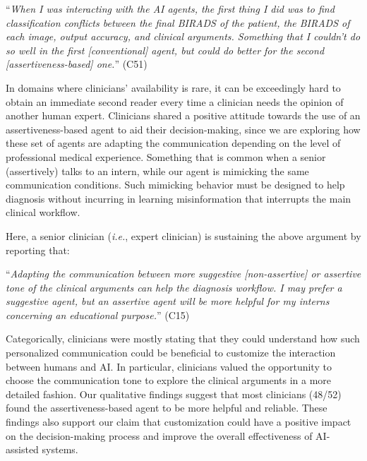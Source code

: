 \vspace{2.5mm}

\noindent
``{\it When I was interacting with the AI agents, the first thing I did was to find classification conflicts between the final BIRADS of the patient, the BIRADS of each image, output accuracy, and clinical arguments. Something that I couldn't do so well in the first [conventional] agent, but could do better for the second [assertiveness-based] one.}'' (C51)

\vspace{2.5mm}

In domains where clinicians' availability is rare, it can be exceedingly hard to obtain an immediate second reader every time a clinician needs the opinion of another human expert.
Clinicians shared a positive attitude towards the use of an assertiveness-based agent to aid their decision-making, since we are exploring how these set of agents are adapting the communication depending on the level of professional medical experience.
Something that is common when a senior (assertively) talks to an intern, while our agent is mimicking the same communication conditions.
Such mimicking behavior must be designed to help diagnosis without incurring in learning misinformation that interrupts the main clinical workflow.

\noindent
Here, a senior clinician ({\it i.e.}, expert clinician) is sustaining the above argument by reporting that:

\vspace{2.5mm}

\noindent
``{\it Adapting the communication between more suggestive [non-assertive] or assertive tone of the clinical arguments can help the diagnosis workflow. I may prefer a suggestive agent, but an assertive agent will be more helpful for my interns concerning an educational purpose.}'' (C15)

\vspace{2.5mm}

Categorically, clinicians were mostly stating that they could understand how such personalized communication could be beneficial to customize the interaction between humans and AI.
In particular, clinicians valued the opportunity to choose the communication tone to explore the clinical arguments in a more detailed fashion.
Our qualitative findings suggest that most clinicians (48/52) found the assertiveness-based agent to be more helpful and reliable.
These findings also support our claim that customization could have a positive impact on the decision-making process and improve the overall effectiveness of AI-assisted systems.

